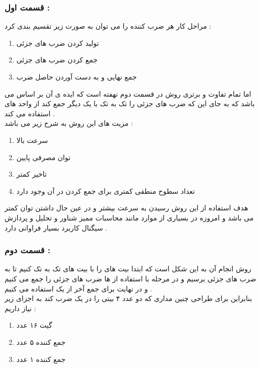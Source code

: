 \documentclass{article}
\begin{document}
\subsubsection*{قسمت اول  : }
مراحل کار هر ضرب کننده را می توان به صورت زیر تقسیم بندی کرد  : 
\begin{center}
	\begin{enumerate}
		\item تولید کردن ضرب های جزئی 
		\item جمع کردن ضرب های جزئی 
		\item جمع نهایی و به دست آوردن حاصل ضرب 
	\end{enumerate}
\end{center}
اما تمام تفاوت و برتری روش 
در قسمت دوم نهفته است که ایده ی آن بر اساس 
می باشد که به جای این که ضرب های جزئی را تک به تک با یک دیگر جمع کند از واحد های 
استفاده می کند  . \\
مزیت های این روش به شرح زیر می باشد  : 
\begin{center}
	\begin{enumerate}
		\item سرعت بالا 
		\item توان مصرفی پایین 
		\item تاخیر کمتر 
		\item تعداد سطوح منطقی کمتری برای جمع کردن در آن وجود دارد 
	\end{enumerate}
\end{center}
هدف استفاده از این روش رسیدن به سرعت بیشتر و در عین حال داشتن توان کمتر می باشد و امروزه در بسیاری از موارد   مانند  محاسبات ممیز شناور و تحلیل و پردازش سیگنال کاربرد بسیار فراوانی دارد . 
\subsubsection*{قسمت دوم  : }
روش انجام آن به این شکل است که ابتدا بیت های 
را با بیت های 
تک به تک 
کنیم تا به ضرب های جزئی برسیم و در مرحله با استفاده از 
ها ضرب های جزئی را جمع می کنیم  و در نهایت برای جمع آخر از یک 
استفاده می کنیم . \\
بنابراین برای طراحی چنین مداری که دو عدد ۴ بیتی را در یک ضرب کند به اجزای زیر نیاز داریم  : 
\begin{center}
	\begin{enumerate}
		\item گیت 
		۱۶ عدد 
		\item جمع کننده 
	۵  عدد 
		\item جمع کننده 
		۱ عدد 
	\end{enumerate}

\end{center}
\end{document}
